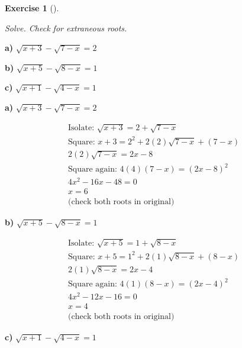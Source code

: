 \documentclass[
  letterpaper,
  DIV=11,
  numbers=noendperiod]{scrreprt}
\theoremstyle{definition}
\newtheorem{exercise}{Exercise}[chapter]
\theoremstyle{remark}
\begin{document}
\begin{exercise}[]\protect\hypertarget{exr-u6-38}{}\label{exr-u6-38}

\emph{Solve. Check for extraneous roots.}

\textbf{a)} \(\displaystyle \sqrt{x + 3} - \sqrt{7 - x} = 2\)

\textbf{b)} \(\displaystyle \sqrt{x + 5} - \sqrt{8 - x} = 1\)

\textbf{c)} \(\displaystyle \sqrt{x + 1} - \sqrt{4 - x} = 1\)

\begin{tcolorbox}[enhanced jigsaw, opacitybacktitle=0.6, coltitle=black, arc=.35mm, colframe=quarto-callout-tip-color-frame, colback=white, bottomrule=.15mm, left=2mm, colbacktitle=quarto-callout-tip-color!10!white, titlerule=0mm, opacityback=0, title=\textcolor{quarto-callout-tip-color}{\faLightbulb}\hspace{0.5em}{🔍 View Solutions}, leftrule=.75mm, breakable, rightrule=.15mm, bottomtitle=1mm, toptitle=1mm, toprule=.15mm]

\textbf{a)} \(\displaystyle \sqrt{x + 3} - \sqrt{7 - x} = 2\)

\begin{align*}
\text{Isolate: } \sqrt{x + 3} = 2 + \sqrt{7-x} \\ \text{Square: } x + 3 = 2^2 + 2(2)\sqrt{7-x} + (7-x) \\ 2(2)\sqrt{7-x} = 2x - 8 \\ \text{Square again: } 4(4)(7-x) = (2x -8)^2 \\ 4x^2 -16x -48 = 0 \\ x = 6 \\ \text{(check both roots in original)}
\end{align*}

\textbf{b)} \(\displaystyle \sqrt{x + 5} - \sqrt{8 - x} = 1\)

\begin{align*}
\text{Isolate: } \sqrt{x + 5} = 1 + \sqrt{8-x} \\ \text{Square: } x + 5 = 1^2 + 2(1)\sqrt{8-x} + (8-x) \\ 2(1)\sqrt{8-x} = 2x - 4 \\ \text{Square again: } 4(1)(8-x) = (2x -4)^2 \\ 4x^2 -12x -16 = 0 \\ x = 4 \\ \text{(check both roots in original)}
\end{align*}

\textbf{c)} \(\displaystyle \sqrt{x + 1} - \sqrt{4 - x} = 1\)


\end{tcolorbox}
\end{exercise}
\end{document}
